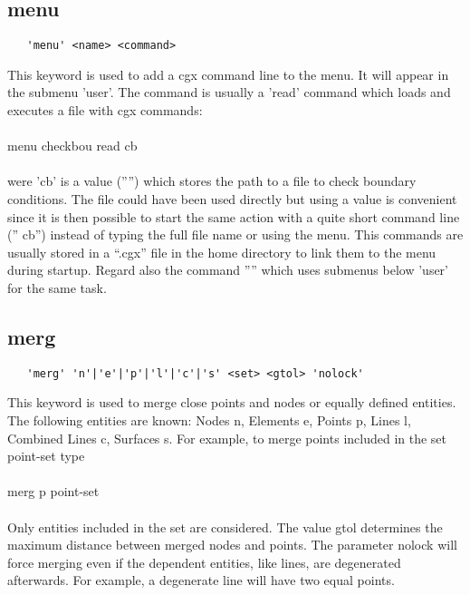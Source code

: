 \documentclass{article}
\begin{document}
\subsection{\label{menu}menu}
\begin{verbatim}
   'menu' <name> <command>
\end{verbatim}
This keyword is used to add a cgx command line to the menu. It will appear in the submenu 'user'. The command is usually a 'read' command which loads and executes a file with cgx commands:\\\\menu checkbou read cb\\\\were 'cb' is a value ('''') which stores the path to a file to check boundary conditions. The file could have been used directly but using a value is convenient since it is then possible to start the same action with a quite short command line ('' cb'') instead of typing the full file name or using the menu. This commands are usually stored in a ``.cgx'' file in the home directory to link them to the menu during startup. Regard also the command '''' which uses submenus below 'user' for the same task. 
 
\subsection{\label{merg}merg}
\begin{verbatim}
   'merg' 'n'|'e'|'p'|'l'|'c'|'s' <set> <gtol> 'nolock' 
\end{verbatim}
This keyword is used to merge close points and nodes or equally defined entities. The following entities are known: Nodes n, Elements e, Points p, Lines l, Combined Lines c, Surfaces s. For example, to merge points included in the set point-set type\\\\merg p point-set\\\\Only entities included in the set are considered. The value gtol determines the maximum distance between merged nodes and points. The parameter nolock will force merging even if the dependent entities, like lines, are degenerated afterwards. For example, a degenerate line will have two equal points.
 
\end{document}
